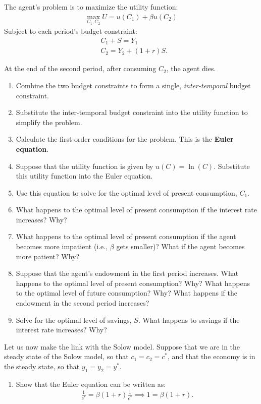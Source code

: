 \documentclass[11pt]{article}
\begin{document}
The agent's problem is to maximize the utility function:
\begin{align*}
    \max_{ C_1, C_2} U = u(C_1) + \beta u(C_2)
\end{align*}
Subject to each period's budget constraint:
\begin{align*}
    & C_1 + S = Y_1
    \\
    & C_2= Y_2 + (1 + r)S.
\end{align*}

At the end of the second period, after consuming \(C_2\), the agent dies.

\begin{enumerate}
    \item Combine the two budget constraints to form a single, \textit{inter-temporal} budget constraint.
    \item Substitute the inter-temporal budget constraint into the utility function to
    simplify the problem.
    \item Calculate the first-order conditions for the problem. This is the \textbf{Euler equation}.
    \item Suppose that the utility function is given by \(u(C) = \ln(C)\). Substitute this utility function into the Euler equation.
    \item Use this equation to solve for the optimal level of present consumption, \(C_1\).
    \item What happens to the optimal level of present consumption if the interest rate increases? Why?
    \item What happens to the optimal level of present consumption if the agent becomes more impatient 
    (i.e., \(\beta\) gets smaller)? What if the agent becomes more patient? Why?
    \item Suppose that the agent's endowment in the first period increases. What happens to the optimal level of present consumption? Why?
    What happens to the optimal level of future consumption? Why? What happens if the endowment in the second period increases?
    \item Solve for the optimal level of savings, \(S\). What happens to savings if the interest rate increases? Why?
\end{enumerate}

Let us now make the link with the Solow model. Suppose that we are in the steady state of the Solow model, so that
\(c_1 = c_2 = c^*\), and that the economy is in the steady state, so that \(y_1 = y_2 = y^*\).

\begin{enumerate}[resume]
    \item Show that the Euler equation can be written as:
    \begin{align*}
        \frac{1}{c^*} =
        \beta(1 + r) \frac{1}{c^*} \implies 1 = \beta(1 + r).
    \end{align*} 
\end{enumerate}
\end{document}
